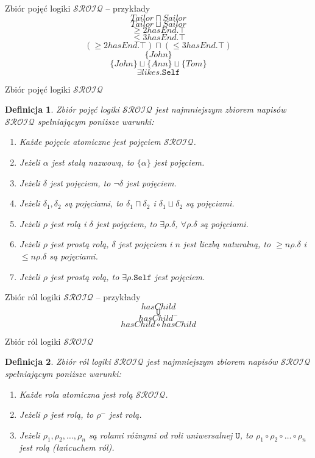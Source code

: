 \documentclass{beamer}
\newtheorem{definicja}{Definicja}
\begin{document}
\begin{frame}{Zbiór pojęć logiki $\mathcal{SROIQ}$ -- przykłady}
%
$$Tailor \sqcap Sailor$$
$$Tailor \sqcup Sailor$$
%
$$\geq 2 hasEnd . \top$$
$$\leq 3 hasEnd . \top$$
%
$$(\geq 2 hasEnd . \top) \sqcap (\leq 3 hasEnd . \top)$$
%
$$\{ John \}$$
%
$$\{ John \} \sqcup \{ Ann \} \sqcup \{ Tom \}$$
%
$$\exists likes .\texttt{Self}$$
\end{frame}


\begin{frame}{Zbiór pojęć logiki $\mathcal{SROIQ}$}
%
\begin{definicja}
\label{CONCEPTSROIQ}
Zbiór pojęć logiki $\mathcal{SROIQ}$ jest najmniejszym zbiorem napisów $\mathcal{SROIQ}$ spełniającym poniższe warunki:
%
\begin{enumerate}
\item Każde pojęcie atomiczne jest pojęciem $\mathcal{SROIQ}$.
%
\item Jeżeli $\alpha$ jest stałą nazwową, to $\{ \alpha \}$ jest pojęciem.
%
\item Jeżeli $\delta$ jest pojęciem, to $\neg \delta$ jest pojęciem.
%
\item Jeżeli $\delta_{1}, \delta_{2}$ są pojęciami, to $\delta_{1} \sqcap \delta_{2}$ i $\delta_{1} \sqcup \delta_{2}$ są pojęciami.
%
\item Jeżeli $\rho$ jest rolą i $\delta$ jest pojęciem, to $\exists \rho . \delta$, $\forall \rho . \delta$ są pojęciami.
%
\item Jeżeli $\rho$ jest prostą rolą, $\delta$ jest pojęciem i $n$ jest liczbą naturalną, to $\geq n \rho . \delta$ i $\leq n \rho . \delta$ są pojęciami.
%
\item Jeżeli $\rho$ jest prostą rolą, to $\exists \rho. \texttt{Self}$ jest pojęciem.
\end{enumerate}
\end{definicja}
\end{frame}

\begin{frame}{Zbiór ról logiki $\mathcal{SROIQ}$ -- przykłady}
%
$$hasChild$$
%
$$\texttt{U}$$
%
$$hasChild^{-}$$
%
$$hasChild \circ hasChild$$
\end{frame}

\begin{frame}{Zbiór ról logiki $\mathcal{SROIQ}$}
%
\begin{definicja}
\label{ROLESROIQ}
Zbiór ról logiki $\mathcal{SROIQ}$ jest najmniejszym zbiorem napisów $\mathcal{SROIQ}$ spełniającym poniższe warunki:
%
\begin{enumerate}
\item Każde rola atomiczna jest rolą $\mathcal{SROIQ}$.
%
\item Jeżeli $\rho$ jest rolą, to $\rho^{-}$ jest rolą.
%
\item Jeżeli $\rho_{1}, \rho_{2}, \dots, \rho_{n}$ są rolami różnymi od roli uniwersalnej $\texttt{U}$, to  $\rho_{1} \circ \rho_{2} \circ \dots \circ \rho_{n}$ jest rolą (łańcuchem ról).
\end{enumerate}
\end{definicja}
\end{frame}
\end{document}
